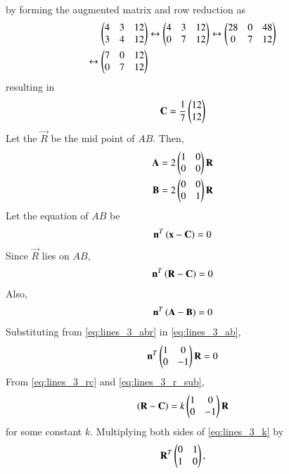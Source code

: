 \documentclass[journal,12pt,twocolumn]{IEEEtran}
\begin{document}
\begin{enumerate}[label=\arabic*]
\begin{align}
\end{align}
by forming the augmented matrix and row reduction as  
\begin{align}
\begin{pmatrix}4 & 3 &12 \\ 3 & 4 &12\end{pmatrix} &\leftrightarrow \begin{pmatrix}4 & 3 &12 \\ 0 & 7 &12\end{pmatrix} \leftrightarrow \begin{pmatrix}28 & 0 & 48 \\ 0 & 7 &12\end{pmatrix}
\nonumber \\
\leftrightarrow \begin{pmatrix}7 & 0 & 12 \\ 0 & 7 &12\end{pmatrix}&
\end{align}
resulting in 
\begin{align}
\mathbf{C}=\frac{1}{7}\begin{pmatrix}12\\12\end{pmatrix}
\end{align}
%
Let the $\vec{R}$ be the mid point of $AB$. Then,
\begin{align}
\label{eq:lines_3_abr}
\mathbf{A} =2 \begin{pmatrix}1 & 0\\0 & 0\end{pmatrix}\mathbf{R} 
\\
\mathbf{B} =2 \begin{pmatrix}0 & 0\\0 & 1\end{pmatrix}\mathbf{R} 
\end{align}
%
Let the equation of $AB$ be 
\begin{align}
\mathbf{n}^T\left(\mathbf{x} - \mathbf{C}\right) = 0
\label{eq:lines_3_def}
\end{align}
Since $\vec{R}$ lies on $AB$, 
\begin{align}
\mathbf{n}^T\left(\mathbf{R} - \mathbf{C}\right) = 0
\label{eq:lines_3_rc}
\end{align}
Also, 
\begin{align}
\mathbf{n}^T\left(\mathbf{A} - \mathbf{B}\right) = 0
\label{eq:lines_3_ab}
\end{align}
%
Substituting from \eqref{eq:lines_3_abr} in \eqref{eq:lines_3_ab},
\begin{align}
\mathbf{n}^T\begin{pmatrix}1 & 0 \\ 0 & -1\end{pmatrix}\mathbf{R} = 0
\label{eq:lines_3_r_sub}
\end{align}
%
From \eqref{eq:lines_3_rc} and \eqref{eq:lines_3_r_sub},
\begin{align}
\left(\mathbf{R} - \mathbf{C}\right) = k\begin{pmatrix}1 & 0 \\ 0 & -1\end{pmatrix}\mathbf{R}
\label{eq:lines_3_k}
\end{align}
%
for some constant $k$.
Multiplying both sides of \eqref{eq:lines_3_k} by 
\begin{align}
\mathbf{R}^T\begin{pmatrix}0 & 1 \\ 1 & 0\end{pmatrix},
\end{align}

\end{enumerate}
\end{document}
